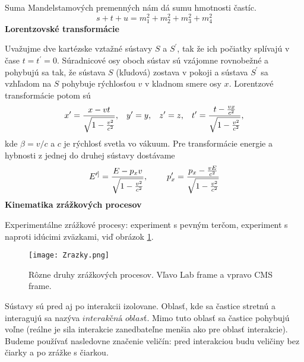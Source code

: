 \documentclass[../../main.tex]{subfiles}
\begin{document}
Suma Mandelstamových premenných nám dá sumu hmotnosti častíc. $$s+t+u=m_1^2+m_2^2+m_3^2+m_4^2$$\newline
\textbf{Lorentzovské transformácie}\par
Uvažujme dve kartézske vztažné sústavy $S$ a $S^{\prime}$, tak že ich počiatky splívajú v čase $t=t^{\prime}=0$. Súradnicové osy oboch sústav sú vzájomne rovnobežné a pohybujú sa tak, že sústava $S$ (kľudová) zostava v pokoji a sústava $S^{\prime}$ sa vzhľadom na $S$ pohybuje rýchlosťou $v$ v kladnom smere osy $x$. Lorentzové transformácie potom sú 
\begin{equation} 
x^{\prime}=\frac{x-vt}{\sqrt{1-\frac{v^2}{c^2}}},\hspace{0.3cm} y^{\prime}=y,\hspace{0.3cm} z^{\prime}=z,\hspace{0.3cm} t^{\prime}=\frac{t-\frac{vx}{c^2}}{\sqrt{1-\frac{v^2}{c^2}}},
\end{equation}
kde $\beta=v/c$ a $c$ je rýchlosť svetla vo vákuum. Pre transformácie energie a hybnosti z jednej do druhej sústavy dostávame 
\begin{equation}
E^{\prime]}=\frac{E-p_xv}{\sqrt{1-\frac{v^2}{c^2}}}, \hspace{0.8cm} p_x^{\prime}=\frac{p_x-\frac{vE}{c^2}}{\sqrt{1-\frac{v^2}{c^2}}}
\end{equation}\newline
\textbf{Kinematika zrážkových procesov}\par
Experimentálne zrážkové procesy: experiment s pevným terčom, experiment s naproti idúcimi zväzkami, viď obrázok \ref{sf1:fig:Zrazky}.
\begin{figure}[!h]
\centering
\texttt{[image: Zrazky.png]}
\caption{Rôzne druhy zrážkových procesov. Vľavo Lab frame a vpravo CMS frame.}
\label{sf1:fig:Zrazky}
\end{figure}
Sústavy sú pred aj po interakcii izolovane. Oblasť, kde sa častice stretnú a interagujú sa nazýva $interakčná$ $oblasť$. Mimo tuto oblasť sa častice pohybujú voľne (reálne je sila interakcie zanedbateľne menšia ako pre oblasť interakcie). Budeme používať nasledovne značenie veličín: pred interakciou budu veličiny bez čiarky a po zrážke s čiarkou.
\end{document}

